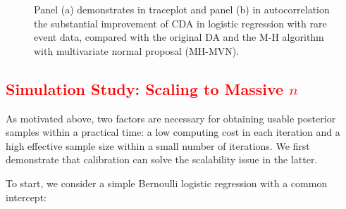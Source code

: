 \documentclass[11pt]{article}
\newcommand{\leo}[1]{{\textcolor{red}{#1}}}
\begin{document}
\begin{figure}[H]
  {%
    \qquad
  }
  {\caption{Panel (a) demonstrates in traceplot and panel (b) in autocorrelation the substantial improvement of CDA in logistic regression with rare event data, compared with the original DA \citep{polson2013bayesian} and the M-H algorithm with multivariate normal proposal (MH-MVN).\label{logit_random_mixing}}}
\end{figure}

\leo{
\section{Simulation Study: Scaling to Massive $n$}
}

As motivated above,  two factors are necessary for obtaining usable posterior samples within a practical  time: a low computing cost  in each iteration and a high effective sample size within a small number of iterations. We first demonstrate that calibration can solve the scalability issue in the latter.

To start, we consider a simple Bernoulli logistic regression with a common intercept:
\end{document}
